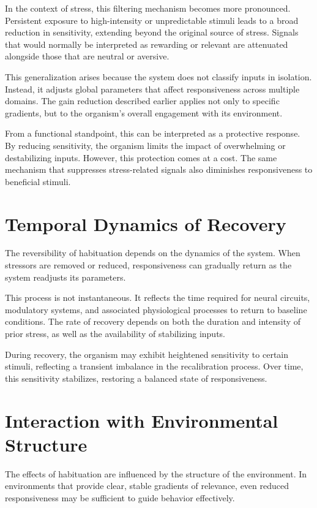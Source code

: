 \documentclass[11pt,oneside]{book}
\begin{document}
In the context of stress, this filtering mechanism becomes more pronounced. Persistent exposure to high-intensity or unpredictable stimuli leads to a broad reduction in sensitivity, extending beyond the original source of stress. Signals that would normally be interpreted as rewarding or relevant are attenuated alongside those that are neutral or aversive.

This generalization arises because the system does not classify inputs in isolation. Instead, it adjusts global parameters that affect responsiveness across multiple domains. The gain reduction described earlier applies not only to specific gradients, but to the organism’s overall engagement with its environment.

From a functional standpoint, this can be interpreted as a protective response. By reducing sensitivity, the organism limits the impact of overwhelming or destabilizing inputs. However, this protection comes at a cost. The same mechanism that suppresses stress-related signals also diminishes responsiveness to beneficial stimuli.

\section{Temporal Dynamics of Recovery}

The reversibility of habituation depends on the dynamics of the system. When stressors are removed or reduced, responsiveness can gradually return as the system readjusts its parameters.

This process is not instantaneous. It reflects the time required for neural circuits, modulatory systems, and associated physiological processes to return to baseline conditions. The rate of recovery depends on both the duration and intensity of prior stress, as well as the availability of stabilizing inputs.

During recovery, the organism may exhibit heightened sensitivity to certain stimuli, reflecting a transient imbalance in the recalibration process. Over time, this sensitivity stabilizes, restoring a balanced state of responsiveness.

\section{Interaction with Environmental Structure}

The effects of habituation are influenced by the structure of the environment. In environments that provide clear, stable gradients of relevance, even reduced responsiveness may be sufficient to guide behavior effectively.
\end{document}
